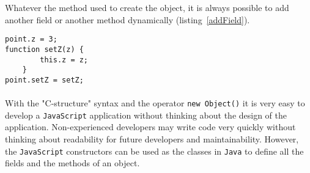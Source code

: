 Whatever the method used to create the object, it is always possible to add another field or another method dynamically (listing~\ref{addField}).
\begin{lstlisting}[caption=Adding a new field or a new method dynamically", label={addField}]
point.z = 3;
function setZ(z) {
        this.z = z;
    }
point.setZ = setZ;
\end{lstlisting}

\paragraph{}
With the "C-structure" syntax and the operator \texttt{new Object()} it is very easy to develop a \texttt{JavaScript} application without thinking about the design of the application. Non-experienced developers may write code very quickly without thinking about readability for future developers and maintainability. However, the \texttt{JavaScript} constructors can be used as the classes in \texttt{Java} to define all the fields and the methods of an object.



